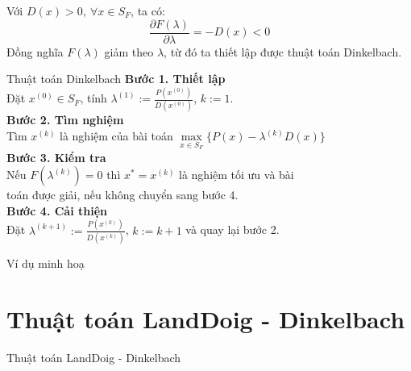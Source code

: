 \documentclass{beamer}
\begin{document}
\begin{frame} \Large
Với $D(x)>0, \: \forall x \in S_F$, ta có:
\begin{equation}
\frac{\partial F(\lambda)}{\partial \lambda}= -D(x) < 0
\end{equation}
Đồng nghĩa $F(\lambda)$ giảm theo $\lambda$, từ đó ta thiết lập được thuật toán Dinkelbach.
\end{frame}

\begin{frame}{Thuật toán Dinkelbach}
\setlength{\parindent}{4em}
\noindent \textbf{Bước 1. Thiết lập} \\
Đặt $x^{(0)} \in S_F$, tính $\lambda^{(1)}:=\frac{P(x^{(0)})}{D(x^{(0)})}$, $k:=1$. \\
\noindent \textbf{Bước 2. Tìm nghiệm} \\
Tìm $x^{(k)}$ là nghiệm của bài toán $\underset{x \in S_F}{\max}\{P(x)-\lambda^{(k)} D(x)\}$ \\
\noindent \textbf{Bước 3. Kiểm tra} \\
Nếu $F(\lambda^{(k)})=0$ thì $x^*=x^{(k)}$ là nghiệm tối ưu và bài \\ toán được giải, nếu không chuyển sang bước 4. \\
\noindent \textbf{Bước 4. Cải thiện} \\
Đặt $\lambda^{(k+1)}:=\frac{P(x^{(k)})}{D(x^{(k)})}$, $k:=k+1$ và quay lại bước 2.
\end{frame}

\begin{frame}{Ví dụ minh hoạ}
\end{frame}
\section{Thuật toán LandDoig - Dinkelbach}
\begin{frame}
   \center 
   \Huge Thuật toán LandDoig - Dinkelbach
\end{frame}

\begin{frame}
\end{frame}
\end{document}

